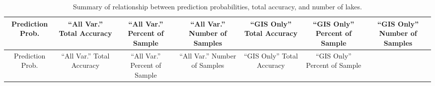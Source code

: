 \documentclass[11pt,]{article}
\begin{document}
\begin{longtable}[c]{@{}ccccccc@{}}
\caption{Summary of relationship between prediction probabilities, total
accuracy, and number of lakes. \label{tab:cond_prob_tab}}\tabularnewline
\toprule
\begin{minipage}[b]{0.08\columnwidth}\centering\strut
Prediction Prob.
\strut\end{minipage} &
\begin{minipage}[b]{0.11\columnwidth}\centering\strut
``All Var.'' Total Accuracy
\strut\end{minipage} &
\begin{minipage}[b]{0.13\columnwidth}\centering\strut
``All Var.'' Percent of Sample
\strut\end{minipage} &
\begin{minipage}[b]{0.13\columnwidth}\centering\strut
``All Var.'' Number of Samples
\strut\end{minipage} &
\begin{minipage}[b]{0.11\columnwidth}\centering\strut
``GIS Only'' Total Accuracy
\strut\end{minipage} &
\begin{minipage}[b]{0.13\columnwidth}\centering\strut
``GIS Only'' Percent of Sample
\strut\end{minipage} &
\begin{minipage}[b]{0.13\columnwidth}\centering\strut
``GIS Only'' Number of Samples
\strut\end{minipage}\tabularnewline
\midrule
\endfirsthead
\toprule
\begin{minipage}[b]{0.08\columnwidth}\centering\strut
Prediction Prob.
\strut\end{minipage} &
\begin{minipage}[b]{0.11\columnwidth}\centering\strut
``All Var.'' Total Accuracy
\strut\end{minipage} &
\begin{minipage}[b]{0.13\columnwidth}\centering\strut
``All Var.'' Percent of Sample
\strut\end{minipage} &
\begin{minipage}[b]{0.13\columnwidth}\centering\strut
``All Var.'' Number of Samples
\strut\end{minipage} &
\begin{minipage}[b]{0.11\columnwidth}\centering\strut
``GIS Only'' Total Accuracy
\strut\end{minipage} &
\begin{minipage}[b]{0.13\columnwidth}\centering\strut
``GIS Only'' Percent of Sample

\end{minipage}
\end{longtable}
\end{document}
